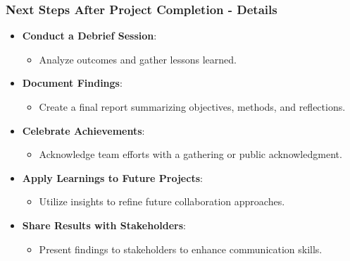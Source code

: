 \documentclass[aspectratio=169]{beamer}
\begin{document}
\begin{frame}[fragile]
    \frametitle{Next Steps After Project Completion - Details}
    
    \begin{itemize}
        \item \textbf{Conduct a Debrief Session}:
            \begin{itemize}
                \item Analyze outcomes and gather lessons learned.
            \end{itemize}
        
        \item \textbf{Document Findings}:
            \begin{itemize}
                \item Create a final report summarizing objectives, methods, and reflections.
            \end{itemize}
        
        \item \textbf{Celebrate Achievements}:
            \begin{itemize}
                \item Acknowledge team efforts with a gathering or public acknowledgment.
            \end{itemize}
        
        \item \textbf{Apply Learnings to Future Projects}:
            \begin{itemize}
                \item Utilize insights to refine future collaboration approaches.
            \end{itemize}

        \item \textbf{Share Results with Stakeholders}:
            \begin{itemize}
                \item Present findings to stakeholders to enhance communication skills.
            \end{itemize}
    \end{itemize}
\end{frame}
\end{document}
